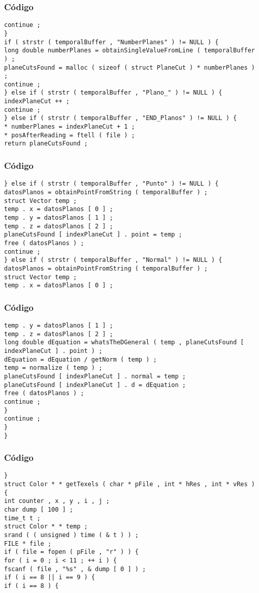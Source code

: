 \documentclass{beamer}
\begin{document}
\begin{frame}[fragile]
\frametitle{C\'odigo}
\begin{verbatim}
continue ; 
} 
if ( strstr ( temporalBuffer , "NumberPlanes" ) != NULL ) { 
long double numberPlanes = obtainSingleValueFromLine ( temporalBuffer ) ; 
planeCutsFound = malloc ( sizeof ( struct PlaneCut ) * numberPlanes ) ; 
continue ; 
} else if ( strstr ( temporalBuffer , "Plano_" ) != NULL ) { 
indexPlaneCut ++ ; 
continue ; 
} else if ( strstr ( temporalBuffer , "END_Planos" ) != NULL ) { 
* numberPlanes = indexPlaneCut + 1 ; 
* posAfterReading = ftell ( file ) ; 
return planeCutsFound ; 
\end{verbatim}
\end{frame}
\begin{frame}[fragile]
\frametitle{C\'odigo}
\begin{verbatim}
} else if ( strstr ( temporalBuffer , "Punto" ) != NULL ) { 
datosPlanos = obtainPointFromString ( temporalBuffer ) ; 
struct Vector temp ; 
temp . x = datosPlanos [ 0 ] ; 
temp . y = datosPlanos [ 1 ] ; 
temp . z = datosPlanos [ 2 ] ; 
planeCutsFound [ indexPlaneCut ] . point = temp ; 
free ( datosPlanos ) ; 
continue ; 
} else if ( strstr ( temporalBuffer , "Normal" ) != NULL ) { 
datosPlanos = obtainPointFromString ( temporalBuffer ) ; 
struct Vector temp ; 
temp . x = datosPlanos [ 0 ] ; 
\end{verbatim}
\end{frame}
\begin{frame}[fragile]
\frametitle{C\'odigo}
\begin{verbatim}
temp . y = datosPlanos [ 1 ] ; 
temp . z = datosPlanos [ 2 ] ; 
long double dEquation = whatsTheDGeneral ( temp , planeCutsFound [ indexPlaneCut ] . point ) ; 
dEquation = dEquation / getNorm ( temp ) ; 
temp = normalize ( temp ) ; 
planeCutsFound [ indexPlaneCut ] . normal = temp ; 
planeCutsFound [ indexPlaneCut ] . d = dEquation ; 
free ( datosPlanos ) ; 
continue ; 
} 
continue ; 
} 
} 
\end{verbatim}
\end{frame}
\begin{frame}[fragile]
\frametitle{C\'odigo}
\begin{verbatim}
} 
struct Color * * getTexels ( char * pFile , int * hRes , int * vRes ) { 
int counter , x , y , i , j ; 
char dump [ 100 ] ; 
time_t t ; 
struct Color * * temp ; 
srand ( ( unsigned ) time ( & t ) ) ; 
FILE * file ; 
if ( file = fopen ( pFile , "r" ) ) { 
for ( i = 0 ; i < 11 ; ++ i ) { 
fscanf ( file , "%s" , & dump [ 0 ] ) ; 
if ( i == 8 || i == 9 ) { 
if ( i == 8 ) { 
\end{verbatim}
\end{frame}
\end{document}
